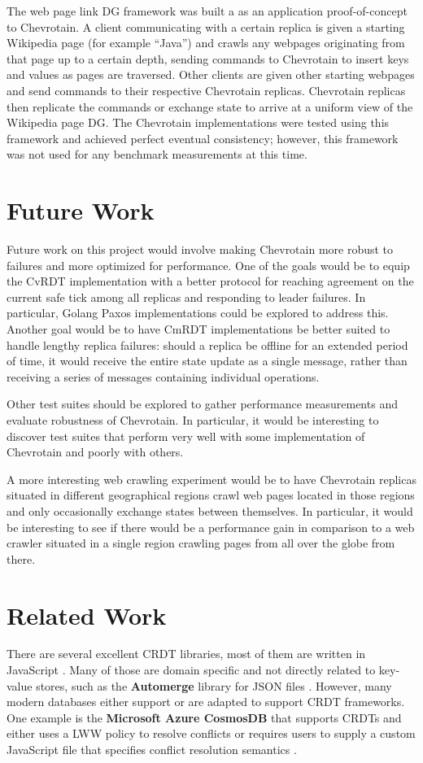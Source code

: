 \documentclass[sigconf,nonacm,10pt]{acmart}
\begin{document}
The web page link DG framework was built a as an application proof-of-concept to Chevrotain. A client communicating with a certain replica is given a starting Wikipedia page (for example ``Java'') and crawls any webpages originating from that page up to a certain depth, sending commands to Chevrotain to insert keys and values as pages are traversed. Other clients are given other starting webpages and send commands to their respective Chevrotain replicas. Chevrotain replicas then replicate the commands or exchange state to arrive at a uniform view of the Wikipedia page DG. The Chevrotain implementations were tested using this framework and achieved perfect eventual consistency; however, this framework was not used for any benchmark measurements at this time.

\section{Future Work}
Future work on this project would involve making Chevrotain more robust to failures and more optimized for performance. One of the goals would be to equip the CvRDT implementation with a better protocol for reaching agreement on the current safe tick among all replicas and responding to leader failures. In particular, Golang Paxos implementations \cite{paxos} could be explored to address this. Another goal would be to have CmRDT implementations be better suited to handle lengthy replica failures: should a replica be offline for an extended period of time, it would receive the entire state update as a single message, rather than receiving a series of messages containing individual operations.

Other test suites should be explored to gather performance measurements and evaluate robustness of Chevrotain. In particular, it would be interesting to discover test suites that perform very well with some implementation of Chevrotain and poorly with others.

A more interesting web crawling experiment would be to have Chevrotain replicas situated in different geographical regions crawl web pages located in those regions and only occasionally exchange states between themselves. In particular, it would be interesting to see if there would be a performance gain in comparison to a web crawler situated in a single region crawling pages from all over the globe from there.

\section{Related Work}
There are several excellent CRDT libraries, most of them are written in JavaScript \cite{crdt}. Many of those are domain specific and not directly related to key-value stores, such as the \textbf{Automerge} library for JSON files \cite{automerge}. However, many modern databases either support or are adapted to support CRDT frameworks. One example is the \textbf{Microsoft Azure CosmosDB} that supports CRDTs and either uses a LWW policy to resolve conflicts or requires users to supply a custom JavaScript file that specifies conflict resolution semantics \cite{cosmosdb}. 
\end{document}
